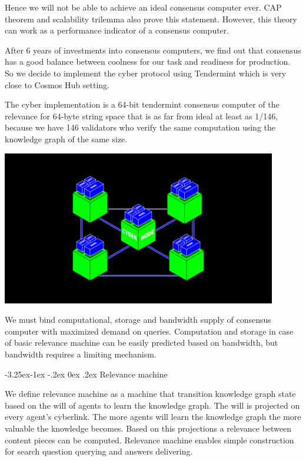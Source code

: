 \documentclass[8pt,oneside]{amsart}
\makeatletter
\newcommand{\linkgreen}[2]{\href{#1}{\color{green}{#2}}}
\renewcommand\subsection{\@startsection{subsection}{2}{\z@}%
                                     {-3.25ex\@plus -1ex \@minus -.2ex}%
                                     {0ex \@plus .2ex}%
                                     {\play\Large}}%
\newcommand{\titleSection}[1]{\subsection{#1}}
\newcommand{\code}[1]{{\PlayBold #1}}
\newenvironment{Figure}
  {\par\medskip\noindent\minipage{\linewidth}}
  {\endminipage\par\medskip}
\makeatother
\begin{document}
Hence we will not be able to achieve an ideal consensus computer ever. CAP theorem and scalability trilemma also prove this statement. However, this theory can work as a performance indicator of a consensus computer.

After 6 years of investments into consensus computers, we find out that \linkgreen{https://ipfs.io/ipfs/QmaMtD7xDgghqgjN62zWZ5TBGFiEjGQtuZBjJ9sMh816KJ}{Tendermint} consensus has a good balance between coolness for our task and readiness for production. So we decide to implement the \code{cyber} protocol using Tendermint which is very close to Cosmos Hub setting.

The \code{cyber} implementation is a 64-bit tendermint consensus computer of the relevance for 64-byte string space that is as far from ideal at least as 1/146, because we have 146 validators who verify the same computation using the knowledge graph of the same size.

\begin{Figure}
  \centering
  \includegraphics[width=0.9\textwidth]{computer.png}
\end{Figure}

We must bind computational, storage and bandwidth supply of consensus computer with maximized demand on queries. Computation and storage in case of basic relevance machine can be easily predicted based on bandwidth, but bandwidth requires a limiting mechanism.

\titleSection{Relevance machine}\label{relevance-machine}

We define relevance machine as a machine that transition knowledge graph state based on the will of agents to learn the knowledge graph. The will is projected on every agent's cyberlink. The more agents will learn the knowledge graph the more valuable the knowledge becomes. Based on this projections a relevance between content pieces can be computed. Relevance machine enables simple construction for search question querying and answers delivering. 
\end{document}

